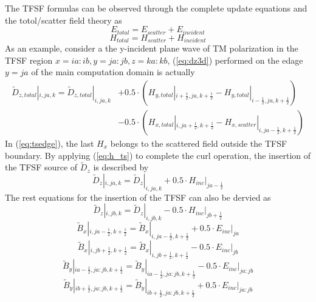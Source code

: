 The TFSF formulas can be observed through the complete update equations and the totol/scatter field theory as
\begin{displaymath}\label{eq:e_ts}
  E_{total}=E_{scatter}+E_{incident}
\end{displaymath}
\begin{displaymath}\label{eq:h_ts}
  H_{total}=H_{scatter}+H_{incident}  
\end{displaymath}
As an example, consider a the y-incident plane wave of TM polarization in the TFSF region $x=ia:ib, y=ja:jb, z=ka:kb$,
(\ref{eq:dz3d}) performed on the edage $y=ja$ of the main computation domain is actually
\begin{equation}\label{eq:tsedge}
  \begin{split}
    \widetilde{D}_{z,total}|_{i,ja,k} = \widetilde{D}_{z,total}|_{i,ja,k} &+ 0.5 \cdot \left( H_{y,total}|_{i+\frac{1}{2},ja,k+\frac{1}{2}} - H_{y,total}|_{i-\frac{1}{2},ja,k+\frac{1}{2}} \right) \\
    &- 0.5 \cdot \left( H_{x,total}|_{i,ja+\frac{1}{2},k+\frac{1}{2}} - H_{x,scatter}|_{i,ja-\frac{1}{2},k+\frac{1}{2}} \right)    
  \end{split}
\end{equation}
In (\ref{eq:tsedge}), the last $H_x$ belongs to the scattered field outside the TFSF boundary. By applying
(\ref{eq:h_ts}) to complete the curl operation, the insertion of the TFSF source of $\widetilde{D}_z$ is described by
\begin{displaymath}
  \widetilde{D}_z|_{i,ja,k} = \widetilde{D}_z|_{i,ja,k} + 0.5 \cdot H_{inc}|_{ja-\frac{1}{2}}
\end{displaymath}
The rest equations for the insertion of the TFSF can also be dervied as
\begin{displaymath}
  \widetilde{D}_z|_{i,jb,k} = \widetilde{D}_z|_{i,jb,k} - 0.5 \cdot H_{inc}|_{jb+\frac{1}{2}}  
\end{displaymath}
\begin{displaymath}
  \widetilde{B}_x|_{i,ja-\frac{1}{2},k+\frac{1}{2}}=\widetilde{B}_x|_{i,ja-\frac{1}{2},k+\frac{1}{2}}+0.5 \cdot E_{inc}|_{ja}
\end{displaymath}
\begin{displaymath}
  \widetilde{B}_x|_{i,jb+\frac{1}{2},k+\frac{1}{2}}=\widetilde{B}_x|_{i,jb+\frac{1}{2},k+\frac{1}{2}}-0.5 \cdot E_{inc}|_{jb}
\end{displaymath}
\begin{displaymath}
  \widetilde{B}_y|_{ia-\frac{1}{2},ja:jb,k+\frac{1}{2}}=\widetilde{B}_y|_{ia-\frac{1}{2},ja:jb,k+\frac{1}{2}}-0.5 \cdot E_{inc}|_{ja:jb}
\end{displaymath}
\begin{displaymath}
  \widetilde{B}_y|_{ib+\frac{1}{2},ja:jb,k+\frac{1}{2}}=\widetilde{B}_y|_{ib+\frac{1}{2},ja:jb,k+\frac{1}{2}}+0.5 \cdot E_{inc}|_{ja:jb}
\end{displaymath}






